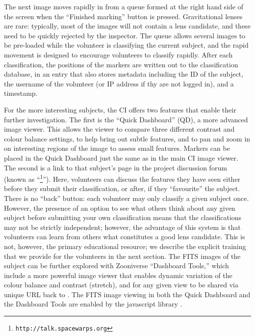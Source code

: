 \documentclass[useAMS,usenatbib,a4paper]{mn2e}
\begin{document}
The next image moves rapidly in from a queue formed at the right hand side of
the screen when the ``Finished marking'' button is pressed. Gravitational lenses
are rare: typically, most of the images will not contain a lens candidate, and
these need to be quickly rejected by the inspector. The queue allows several
images to be pre-loaded while the volunteer is classifying the current subject,
and the rapid movement is designed to encourage volunteers to classify rapidly.
After each classification, the positions of the markers are written out to the
classification database, in an entry that also stores metadata including the ID
of the subject, the username of the volunteer  (or IP address if thy are not
logged in), and a timestamp.

For the more interesting subjects, the CI offers two features that enable their
further investigation. The first is the ``Quick Dashboard''
(QD), a more advanced image viewer. This allows the viewer to compare three
different contrast and colour balance settings, to help bring out subtle
features, and to pan and zoom in on interesting regions of the image to assess
small features. Markers can be placed in the Quick Dashboard just the same as
in the main CI image viewer. The second is a link to that subject's page in
the project discussion forum (known as
``\Talk\footnote{\texttt{http://talk.spacewarps.org}}'').
Here, volunteers can discuss the features they have seen either
before they submit their classification, or after, if they ``favourite'' the
subject. There is no ``back'' button: each volunteer may only classify a given
subject once. However, the presence of an option to see what others think
about any given subject before submitting your own classification means that
the classifications may not be strictly independent; however, the advantage of this
system is that volunteers can learn from others what constitutes a good lens
candidate. This is not, however, the primary educational resource; we describe
the explicit training that we provide for the volunteers in the next section.
The FITS images of the subject can be further explored with Zooniverse
``Dashboard Tools,'' which include a
more powerful image viewer that enables dynamic
variation of the colour balance and contrast (stretch), and for any given view
to be shared via unique URL back to \Talk. The FITS image viewing in both the
Quick Dashboard and the Dashboard Tools are enabled by the javascript library
\fitsjs \citep{fitsjs}.


\end{document}
